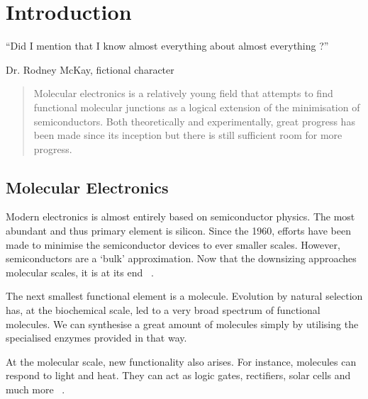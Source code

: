 \chapter{Introduction}
\label{ch:chapter_1}



\epigraph{
    “Did I mention that I know almost everything about almost everything ?”
}{Dr. Rodney McKay, fictional character}

\begin{abstract}
Molecular electronics is a relatively young field that attempts to find functional molecular junctions as a logical extension of the minimisation of semiconductors. Both theoretically and experimentally, great progress has been made since its inception but there is still sufficient room for more progress. 
\end{abstract}

\newpage
\section{Molecular Electronics}
Modern electronics is almost entirely based on semiconductor physics. The most abundant and thus primary element is silicon. Since the 1960, efforts have been made to minimise the semiconductor devices to ever smaller scales. However, semiconductors are a `bulk' approximation. Now that the downsizing approaches molecular scales, it is at its end ~\cite{seldenthuis}.

The next smallest functional element is a molecule. Evolution by natural selection has, at the biochemical scale, led to a very broad spectrum of functional molecules. We can synthesise a great amount of molecules simply by utilising the specialised enzymes provided in that way.

At the molecular scale, new functionality also arises. For instance, molecules can respond to light and heat. They can act as logic gates, rectifiers, solar cells and much more ~\cite{perrin}. 

